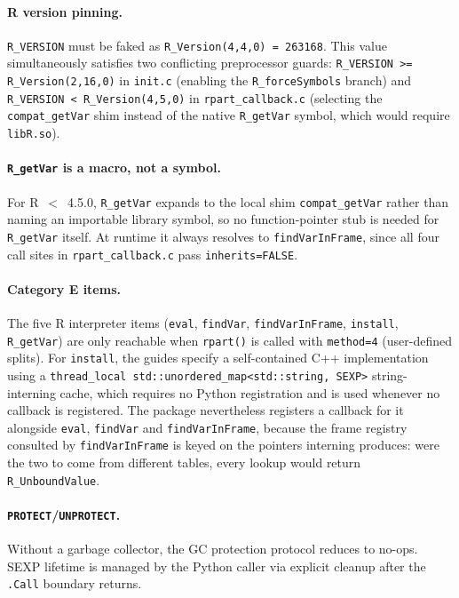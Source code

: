 \documentclass[12pt]{article}
\begin{document}
\paragraph{R version pinning.} \texttt{R\_VERSION} must be faked as \texttt{R\_Version(4,4,0) = 263168}. This value simultaneously satisfies two conflicting preprocessor guards: \texttt{R\_VERSION >= R\_Version(2,16,0)} in \texttt{init.c} (enabling the \texttt{R\_forceSymbols} branch) and \texttt{R\_VERSION < R\_Version(4,5,0)} in \texttt{rpart\_callback.c} (selecting the \texttt{compat\_getVar} shim instead of the native \texttt{R\_getVar} symbol, which would require \texttt{libR.so}).

\paragraph{\texttt{R\_getVar} is a macro, not a symbol.} For R~$<$~4.5.0, \texttt{R\_getVar} expands to the local shim \texttt{compat\_getVar} rather than naming an importable library symbol, so no function-pointer stub is needed for \texttt{R\_getVar} itself. At runtime it always resolves to \texttt{findVarInFrame}, since all four call sites in \texttt{rpart\_callback.c} pass \texttt{inherits=FALSE}.

\paragraph{Category E items.} The five R interpreter items (\texttt{eval}, \texttt{findVar}, \texttt{findVarInFrame}, \texttt{install}, \texttt{R\_getVar}) are only reachable when \texttt{rpart()} is called with \texttt{method=4} (user-defined splits). For \texttt{install}, the guides specify a self-contained C++ implementation using a \texttt{thread\_local std::unordered\_map<std::string, SEXP>} string-interning cache, which requires no Python registration and is used whenever no callback is registered. The package nevertheless registers a callback for it alongside \texttt{eval}, \texttt{findVar} and \texttt{findVarInFrame}, because the frame registry consulted by \texttt{findVarInFrame} is keyed on the pointers interning produces: were the two to come from different tables, every lookup would return \texttt{R\_UnboundValue}.

\paragraph{\texttt{PROTECT}/\texttt{UNPROTECT}.} Without a garbage collector, the GC protection protocol reduces to no-ops. SEXP lifetime is managed by the Python caller via explicit cleanup after the \texttt{.Call} boundary returns.
\end{document}
